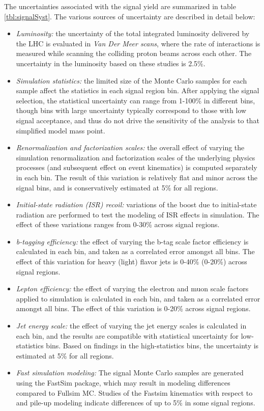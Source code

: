 The uncertainties associated with the signal yield are summarized in table \ref{tbl:signalSyst}. The various sources of uncertainty are described in detail below:
\begin{itemize}
	\item {\it Luminosity:} the uncertainty of the total integrated luminosity delivered by the LHC is evaluated in {\it Van Der Meer scans}, where the rate of interactions is measured while scanning the colliding proton beams across each other. The uncertainty in the luminosity based on these studies is 2.5\%.
	\item {\it Simulation statistics:} the limited size of the Monte Carlo samples for each sample affect the statistics in each signal region bin. After applying the signal selection, the statistical uncertainty can range from 1-100\% in different bins, though bins with large uncertainty typically correspond to those with low signal acceptance, and thus do not drive the sensitivity of the analysis to that simplified model mass point.
	\item {\it Renormalization and factorization scales:} the overall effect of varying the simulation renormalization and factorization scales of the underlying physics processes (and subsequent effect on event kinematics) is computed separately in each bin. The result of this variation is relatively flat and minor across the signal bins, and is conservatively estimated at 5\% for all regions.
	\item {\it Initial-state radiation (ISR) recoil:} variations of the boost due to initial-state radiation are performed to test the modeling of ISR effects in simulation. The effect of these variations ranges from 0-30\% across signal regions.
	\item {\it b-tagging efficiency:} the effect of varying the b-tag scale factor efficiency is calculated in each bin, and taken as a correlated error amongst all bins. The effect of this variation for heavy (light) flavor jets is 0-40\% (0-20\%) across signal regions.
	\item {\it Lepton efficiency:} the effect of varying the electron and muon scale factors applied to simulation is calculated in each bin, and taken as a correlated error amongst all bins. The effect of this variation is 0-20\% across signal regions.
	\item {\it Jet energy scale:} the effect of varying the jet energy scales is calculated in each bin, and the results are compatible with statistical uncertainty for low-statistics bins. Based on findings in the high-statistics bins, the uncertainty is estimated at 5\% for all regions.
	\item {\it Fast simulation modeling:} The signal Monte Carlo samples are generated using the FastSim package, which may result in modeling differences compared to Fullsim MC. Studies of the Fastsim kinematics with respect to \MET and pile-up modeling indicate differences of up to 5\% in some signal regions.
\end{itemize}

